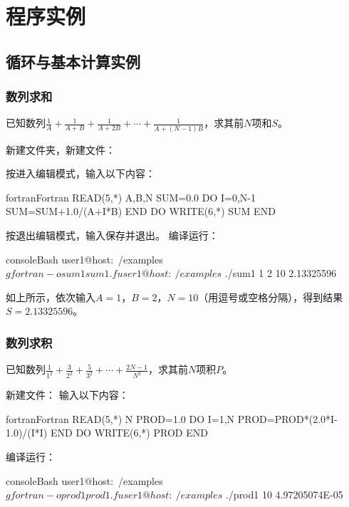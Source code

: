 \section{程序实例}

\subsection{循环与基本计算实例}

\subsubsection{数列求和}
已知数列$\frac{1}{A}+\frac{1}{A+B}+\frac{1}{A+2B}+\cdots+\frac{1}{A+(N-1)B}$，求其前$N$项和$S$。

新建文件夹，新建文件：


按进入编辑模式，输入以下内容：
\begin{envcode}{fortran}{Fortran}
      READ(5,*) A,B,N
      SUM=0.0
      DO I=0,N-1
          SUM=SUM+1.0/(A+I*B)
      END DO
      WRITE(6,*) SUM
      END
\end{envcode}

按退出编辑模式，输入保存并退出。
编译运行：
\begin{envcode}{console}{Bash}
user1@host:~/examples$ gfortran -o sum1 sum1.f
user1@host:~/examples$ ./sum1
1 2 10
   2.13325596
\end{envcode}

如上所示，依次输入$A=1$，$B=2$，$N=10$（用逗号或空格分隔），得到结果$S=2.13325596$。

\subsubsection{数列求积}
已知数列$+++\cdots+$，求其前$N$项积$P$。

新建文件：
输入以下内容：
\begin{envcode}{fortran}{Fortran}
      READ(5,*) N
      PROD=1.0
      DO I=1,N
          PROD=PROD*(2.0*I-1.0)/(I*I)
      END DO
      WRITE(6,*) PROD
      END
\end{envcode}

编译运行：
\begin{envcode}{console}{Bash}
user1@host:~/examples$ gfortran -o prod1 prod1.f
user1@host:~/examples$ ./prod1
10
   4.97205074E-05
\end{envcode}

